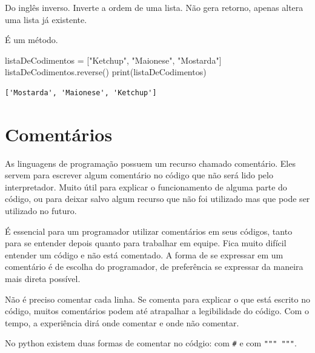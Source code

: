 \documentclass[
  letterpaper,
  DIV=11,
  numbers=noendperiod]{scrreprt}
\newenvironment{Shaded}{\begin{snugshade}}{\end{snugshade}}
\newcommand{\BuiltInTok}[1]{\textcolor[rgb]{0.00,0.23,0.31}{#1}}
\newcommand{\NormalTok}[1]{\textcolor[rgb]{0.00,0.23,0.31}{#1}}
\newcommand{\OperatorTok}[1]{\textcolor[rgb]{0.37,0.37,0.37}{#1}}
\newcommand{\StringTok}[1]{\textcolor[rgb]{0.13,0.47,0.30}{#1}}
\begin{document}
Do inglês inverso. Inverte a ordem de uma lista. Não gera retorno,
apenas altera uma lista já existente.

É um método.

\begin{Shaded}
\begin{Highlighting}[]
\NormalTok{listaDeCodimentos }\OperatorTok{=}\NormalTok{ [}\StringTok{"Ketchup"}\NormalTok{, }\StringTok{"Maionese"}\NormalTok{, }\StringTok{"Mostarda"}\NormalTok{]}
\NormalTok{listaDeCodimentos.reverse()}
\BuiltInTok{print}\NormalTok{(listaDeCodimentos)}
\end{Highlighting}
\end{Shaded}

\begin{tcolorbox}[enhanced jigsaw, breakable, leftrule=.75mm, left=2mm, opacityback=0, bottomrule=.15mm, toprule=.15mm, rightrule=.15mm, arc=.35mm, colback=white]

\begin{verbatim}
['Mostarda', 'Maionese', 'Ketchup']
\end{verbatim}

\end{tcolorbox}


\hypertarget{comentuxe1rios}{%
\chapter{Comentários}\label{comentuxe1rios}}

As linguagens de programação possuem um recurso chamado comentário. Eles
servem para escrever algum comentário no código que não será lido pelo
interpretador. Muito útil para explicar o funcionamento de alguma parte
do código, ou para deixar salvo algum recurso que não foi utilizado mas
que pode ser utilizado no futuro.

É essencial para um programador utilizar comentários em seus códigos,
tanto para se entender depois quanto para trabalhar em equipe. Fica
muito difícil entender um código e não está comentado. A forma de se
expressar em um comentário é de escolha do programador, de preferência
se expressar da maneira mais direta possível.

Não é preciso comentar cada linha. Se comenta para explicar o que está
escrito no código, muitos comentários podem até atrapalhar a
legibilidade do código. Com o tempo, a experiência dirá onde comentar e
onde não comentar.

No python existem duas formas de comentar no códgio: com \texttt{\#} e
com \texttt{"""\ """}.
\end{document}
